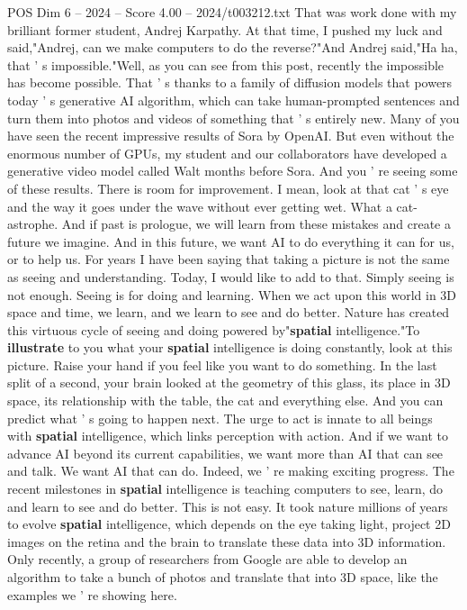 \begin{textsample}{POS Dim 6 – 2024 – Score 4.00 – 2024/t003212.txt}
That was work done with my brilliant former student, Andrej Karpathy.
At that time, I pushed my luck and said,"Andrej, can we make computers to do the reverse?"And Andrej said,"Ha ha, that ' s impossible."Well, as you can see from this post, recently the impossible has become possible.
That ' s thanks to a family of diffusion models that powers today ' s generative AI algorithm, which can take human-prompted sentences and turn them into photos and videos of something that ' s entirely new.
Many of you have seen the recent impressive results of Sora by OpenAI.
But even without the enormous number of GPUs, my student and our collaborators have developed a generative video model called Walt months before Sora.
And you ' re seeing some of these results.
There is room for improvement.
I mean, look at that cat ' s eye and the way it goes under the wave without ever getting wet.
What a cat-astrophe.
And if past is prologue, we will learn from these mistakes and create a future we imagine.
And in this future, we want AI to do everything it can for us, or to help us.
For years I have been saying that taking a picture is not the same as seeing and understanding.
Today, I would like to add to that.
Simply seeing is not enough.
Seeing is for doing and learning.
When we act upon this world in 3D space and time, we learn, and we learn to see and do better.
Nature has created this virtuous cycle of seeing and doing powered by"\textbf{spatial} intelligence."To \textbf{illustrate} to you what your \textbf{spatial} intelligence is doing constantly, look at this picture.
Raise your hand if you feel like you want to do something.
In the last split of a second, your brain looked at the geometry of this glass, its place in 3D space, its relationship with the table, the cat and everything else.
And you can predict what ' s going to happen next.
The urge to act is innate to all beings with \textbf{spatial} intelligence, which links perception with action.
And if we want to advance AI beyond its current capabilities, we want more than AI that can see and talk.
We want AI that can do.
Indeed, we ' re making exciting progress.
The recent milestones in \textbf{spatial} intelligence is teaching computers to see, learn, do and learn to see and do better.
This is not easy.
It took nature millions of years to evolve \textbf{spatial} intelligence, which depends on the eye taking light, project 2D images on the retina and the brain to translate these data into 3D information.
Only recently, a group of researchers from Google are able to develop an algorithm to take a bunch of photos and translate that into 3D space, like the examples we ' re showing here.

\end{textsample}
